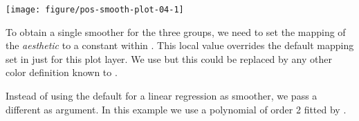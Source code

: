 \documentclass[krantz2]{krantz}\usepackage{knitr}%
\begin{document}
\begin{knitrout}\footnotesize
{}\color{fgcolor}\begin{kframe}
\begin{alltt}
\hlstd{(}  \hlstd{(}     \hlstd{=}  \hlopt{+}
  \hlstd{(} \hlstd{=} \hlstd{)} \hlopt{+}
  \hlstd{()}
\end{alltt}
\end{kframe}

{\centering \texttt{[image: figure/pos-smooth-plot-04-1]} 

}



\end{knitrout}

To obtain a single smoother for the three groups, we need to set the mapping of the  \emph{aesthetic} to a constant within . This local value overrides the default  mapping set in  just for this plot layer. We use  but this could be replaced by any other color definition known to \Rlang.

\begin{knitrout}\footnotesize
{}\color{fgcolor}\begin{kframe}
\begin{alltt}
\hlstd{(}  \hlstd{(}     \hlstd{=}  \hlopt{+}
  \hlstd{(} \hlstd{=} \hlstd{,}  \hlstd{=} \hlstd{)} \hlopt{+}
  \hlstd{()}
\end{alltt}
\end{kframe}
\end{knitrout}

Instead of using the default  for a linear regression as smoother, we pass a different  as argument. In this example we use a polynomial of order 2 fitted by .
\end{document}
